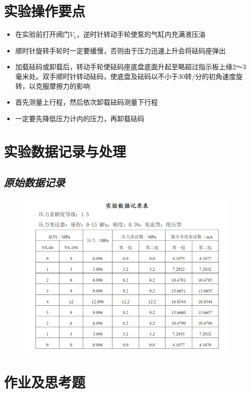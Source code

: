 \documentclass[UTF8]{article}
\begin{document}
	\section{实验操作要点}
	\begin{itemize}
		\item 在实验前打开阀门$V_1$，逆时针转动手轮使泵的气缸内充满液压油
		\item 顺时针旋转手轮时一定要缓慢，否则由于压力迅速上升会将砝码座弹出
		\item 加载砝码或卸载后，转动手轮使砝码座底盘底面升起至略超过指示板上缘2～3毫米处。双手顺时针转动砝码，使底盘及砝码以不小于30转/分的初角速度旋转，以克服摩擦力的影响
		\item 首先测量上行程，然后依次卸载砝码测量下行程
		\item 一定要先降低压力计内的压力，再卸载砝码
	\end{itemize}
	\section{实验数据记录与处理}
	\subsection{\textit{原始数据记录}}
	\begin{figure}[H]
		\centering
		\includegraphics[width=\linewidth]{origin.png}
		\label{fig:origin}
	\end{figure}
	
	\section{作业及思考题}
\end{document}
